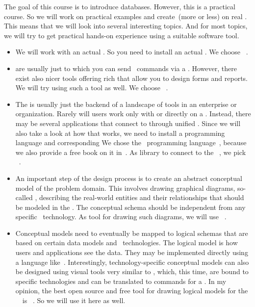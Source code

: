 %
%
%
The goal of this course is to introduce databases.
However, this is a practical course.
So we will work on practical examples and create~(more or less)   on real .
This means that we will look into several interesting topics.
And for most topics, we will try to get practical hands-on experience using a suitable software tool.%
%
\begin{itemize}%
%
\item We will work with an actual .
So you need to install an actual .
We choose \postgresql~\cite{TA2024DDAMWPAM,FP2023LP,OH2017PUAR,B2024PELUYDW}.%
%
\item {} are usually just  to which you can send \sql\ commands via a  .
However, there exist also nicer tools offering rich  that allow you to design forms and reports.
We will try using such a tool as well.
We choose \libreofficeBase~\cite{FNFHWSKLSSGLFRSRPLJG2022BG7R1BOL7C,S2022L7PFEUU}.%
%
\item The  is usually just the backend of a landscape of tools in an enterprise or organization.
Rarely will users work only with or directly on a .
Instead, there may be several applications that connect to  through unified .
Since we will also take a look at how that works, we need to install a programming language and corresponding 
We chose the \python\ programming language~\cite{K2018EIPFEUU,A2002PC,H2023ABGTP3P,LH2015DSAAWP}, because we also provide a free book on it in~\cite{programmingWithPython}.
As library to connect to the \postgresql\ , we pick \psycopg~\cite{VDGE2010P}.%
%
\item An important step of the  design process is to create an abstract conceptual model of the problem domain.
This involves drawing graphical diagrams, so-called , describing the real-world entities and their relationships that should be modeled in the \db.
The conceptual schema should be independent from any specific \dbms\ technology.
As tool for drawing such diagrams, we will use \yEd~\cite{SG2015MDAWY,Y2011YGEM}.%
%
\item Conceptual models need to eventually be mapped to logical schemas that are based on certain data models and \db\ technologies.
The logical model is how users and applications see the data.
They may be implemented directly using a language like~\sql.
Interestingly, technology-specific conceptual models can also be designed using visual tools very similar to , which, this time, are bound to specific technologies and can be translated to commands for a \dbms.
In my opinion, the best open source and free tool for drawing logical models for the \postgresql\ \dbms\ is \pgmodeler~\cite{AES2006PPDM}. %
So we will use it here as well.%
%
\end{itemize}%
